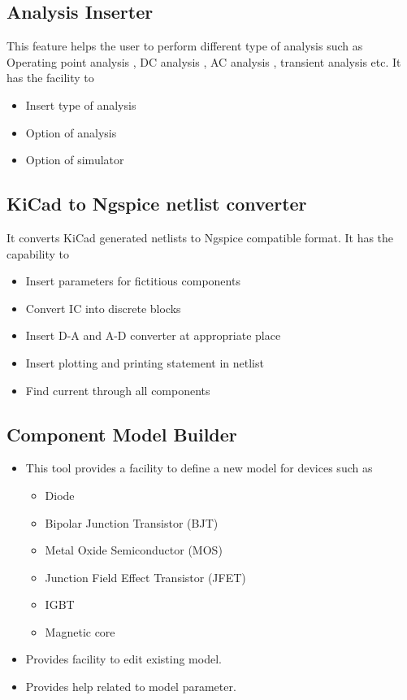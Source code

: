 \subsection {Analysis Inserter}
This feature helps the user to perform different type of analysis such as Operating point analysis , DC analysis , AC analysis , transient analysis  etc. It has the facility to

\begin{itemize}
\item Insert type of analysis
\item Option of analysis
\item Option of simulator
\end{itemize}

\subsection {KiCad to Ngspice netlist converter}
It converts KiCad generated netlists to Ngspice compatible format. It has the capability to

\begin{itemize}
\item Insert parameters for fictitious components
\item Convert IC into discrete blocks
\item Insert D-A and A-D converter at appropriate place
\item Insert plotting and printing statement in netlist
\item Find current through all components
\end{itemize}



\subsection {Component Model Builder}
\begin{itemize}
\item This tool provides a facility to define a new model for devices such as 
\begin{itemize}
            \item Diode
            \item Bipolar Junction Transistor (BJT)
            \item Metal Oxide Semiconductor (MOS)
            \item Junction Field Effect Transistor (JFET)
            \item IGBT
            \item Magnetic core
\end{itemize}
\item  Provides facility to edit existing model.
\item  Provides help related to model parameter.
\end{itemize}
 
